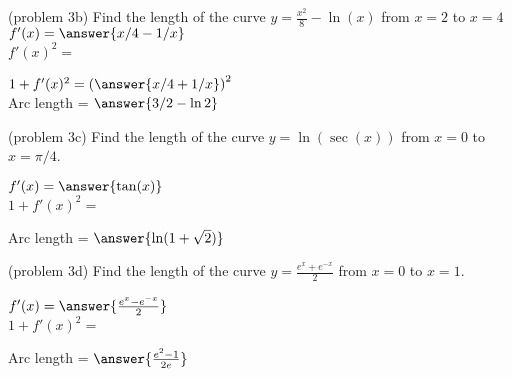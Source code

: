 \documentclass{ximera}
\begin{document}
\begin{problem}(problem 3b)
Find the length of the curve $\displaystyle{y = \frac{x^2}{8} - \ln(x)}$ from $x = 2$ to $x = 4$\\

$f'(x) = \answer{x/4 - 1/x}$\\

$f'(x)^2 =$

\begin{multipleChoice}
\end{multipleChoice}

$1+f'(x)^2 = \left(\answer{x/4 + 1/x}\right)^2$\\

Arc length = $\answer{3/2 - \ln 2}$
\end{problem}


\begin{problem}(problem 3c)
Find the length of the curve $y = \ln(\sec(x))$ from $x = 0$ to $x = \pi/4$.

$f'(x) = \answer{\tan(x)}$\\

$1 + f'(x)^2 =$

\begin{multipleChoice}
\end{multipleChoice}


Arc length = $\answer{\ln(1 + \sqrt 2)}$
\end{problem}



\begin{problem}(problem 3d)
Find the length of the curve $y = \frac{e^x + e^{-x}}{2}$ from $x = 0$ to $x = 1$.

$f'(x) = \answer{\frac{e^x - e^{-x}}{2}}$\\

$1 + f'(x)^2 =$

\begin{multipleChoice}
\end{multipleChoice}


Arc length = $\answer{\frac{e^2 - 1}{2e}}$
\end{problem}
\end{document}
